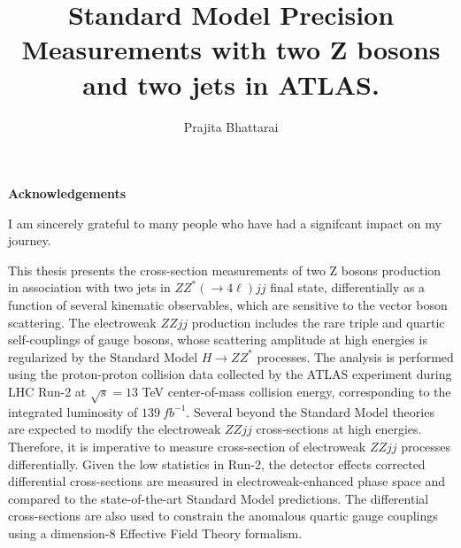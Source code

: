 \documentclass[red]{brandeis-dissertation}
\title{Standard Model Precision Measurements with two Z bosons and two jets in ATLAS.}
\author{Prajita Bhattarai}
\numberwithin{equation}{section}
\begin{document}
\maketitlepage
\clearpage
\makeapproval
\clearpage
\makecopyright
\clearpage
\begin{center}
\textbf{\large{Acknowledgements}}
\end{center}
I am sincerely grateful to many people who have had a signifcant impact on my  journey. 
\clearpage


\begin{dissertation-abstract}

This thesis presents the cross-section measurements of two Z bosons production in association with two jets in $ZZ^*(\rightarrow 4 \ell) jj$ final state, differentially as a function of several kinematic observables, which are sensitive to the vector boson scattering. The electroweak $ZZjj$ production includes the rare triple and quartic self-couplings of gauge bosons, whose scattering amplitude at high energies is regularized by the Standard Model $H\rightarrow ZZ^{*}$ processes. The analysis is performed using the proton-proton collision data collected by the ATLAS experiment during LHC Run-2 at $\sqrt{s}=13$ TeV center-of-mass collision energy, corresponding to the integrated luminosity of $139~fb^{-1}$. Several beyond the Standard Model theories are expected to modify the electroweak $ZZjj$ cross-sections at high energies. Therefore, it is imperative to measure cross-section of electroweak $ZZjj$ processes differentially. Given the low statistics in Run-2, the detector effects corrected differential cross-sections are measured in electroweak-enhanced phase space and compared to the state-of-the-art Standard Model predictions. The differential cross-sections are also used to constrain the anomalous quartic gauge couplings using a dimension-8 Effective Field Theory formalism. 

\end{dissertation-abstract}
\clearpage

\doublespacing

\tableofcontents
\clearpage
{}
{}
\listoftables
\clearpage
{}
{}
\listoffigures
\clearpage


\clearpage

\end{document}
